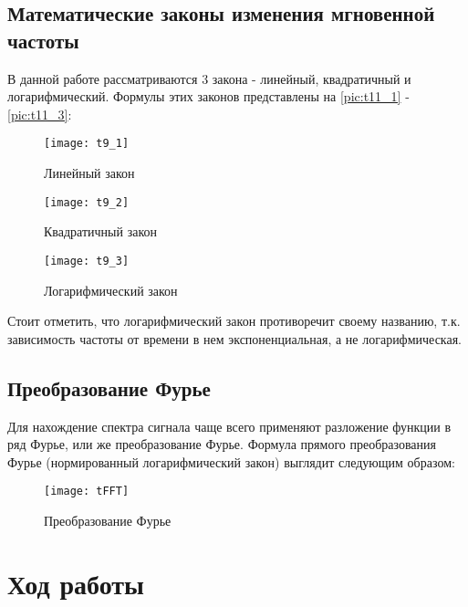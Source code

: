 \subsection{Математические законы изменения мгновенной частоты}
В данной работе рассматриваются 3 закона - линейный, квадратичный и логарифмический. Формулы этих законов представлены на \ref{pic:t11_1} - \ref{pic:t11_3}:
\begin{figure}[H]
	\begin{center}
		\texttt{[image: t9\_1]}
		\caption{Линейный закон} 
		\label{pic:t9_1} %
	\end{center}
\end{figure}
\begin{figure}[H]
	\begin{center}
		\texttt{[image: t9\_2]}
		\caption{Квадратичный закон} 
		\label{pic:t9_2} %
	\end{center}
\end{figure}
\begin{figure}[H]
	\begin{center}
		\texttt{[image: t9\_3]}
		\caption{Логарифмический закон} 
		\label{pic:t9_3} %
	\end{center}
\end{figure}
Стоит отметить, что логарифмический закон противоречит своему названию, т.к. зависимость частоты от времени в нем экспоненциальная, а не логарифмическая.

\subsection{Преобразование Фурье}
Для нахождение спектра сигнала чаще всего применяют разложение функции в ряд Фурье, или же преобразование Фурье.
Формула прямого преобразования Фурье (нормированный логарифмический закон) выглядит следующим образом:
\begin{figure}[H]
	\begin{center}
		\texttt{[image: tFFT]}
		\caption{Преобразование Фурье} 
		\label{pic:tFFT} %
	\end{center}
\end{figure}



\section{Ход работы}

